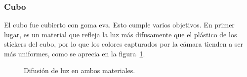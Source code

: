 \subsubsection{Cubo}
El cubo fue cubierto con goma eva. Esto cumple varios objetivos. En primer lugar, es un material que refleja la luz más difusamente que el plástico de los stickers del cubo, por lo que los colores capturados por la cámara tienden a ser más uniformes, como se aprecia en la figura~\ref{luz}.

\begin{figure}[h!]
	\centering
	\caption{Difusión de luz en ambos materiales.}
	\label{luz}
\end{figure}


